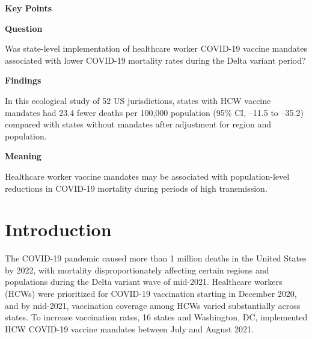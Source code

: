 \documentclass[10pt, letterpaper]{article}
\begin{document}
\hfill
\begin{minipage}[t]{0.33\textwidth}
\noindent{\color{jamalightgray}\rule{\linewidth}{0.4pt}}\vspace{6pt}
{\sffamily\bfseries\fontsize{10}{12}\selectfont\color{jamacrimson}
Key Points\par}
\vspace{4pt}

{\sffamily\bfseries\fontsize{8.5}{10.5}\selectfont Question\enspace}%
{\fontsize{8.5}{10.5}\selectfont
Was state-level implementation of healthcare worker COVID-19 vaccine mandates associated with lower COVID-19 mortality rates during the Delta variant period?\par}

\vspace{6pt}

{\sffamily\bfseries\fontsize{8.5}{10.5}\selectfont Findings\enspace}%
{\fontsize{8.5}{10.5}\selectfont
In this ecological study of 52 US jurisdictions, states with HCW vaccine mandates had 23.4 fewer deaths per 100,000 population (95\% CI, --11.5 to --35.2) compared with states without mandates after adjustment for region and population.\par}

\vspace{6pt}

{\sffamily\bfseries\fontsize{8.5}{10.5}\selectfont Meaning\enspace}%
{\fontsize{8.5}{10.5}\selectfont
Healthcare worker vaccine mandates may be associated with population-level reductions in COVID-19 mortality during periods of high transmission.\par}
\noindent\vspace{4pt}{\color{jamalightgray}\rule{\linewidth}{0.4pt}}



\end{minipage}

\newpage

\section*{Introduction}

The COVID-19 pandemic caused more than 1 million deaths in the United States by 2022, with mortality disproportionately affecting certain regions and populations during the Delta variant wave of mid-2021.\cite{CDC2022} Healthcare workers (HCWs) were prioritized for COVID-19 vaccination starting in December 2020, and by mid-2021, vaccination coverage among HCWs varied substantially across states.\cite{Thompson2021,Talbot2022} To increase vaccination rates, 16 states and Washington, DC, implemented HCW COVID-19 vaccine mandates between July and August 2021.\cite{Mullen2022}
\end{document}
